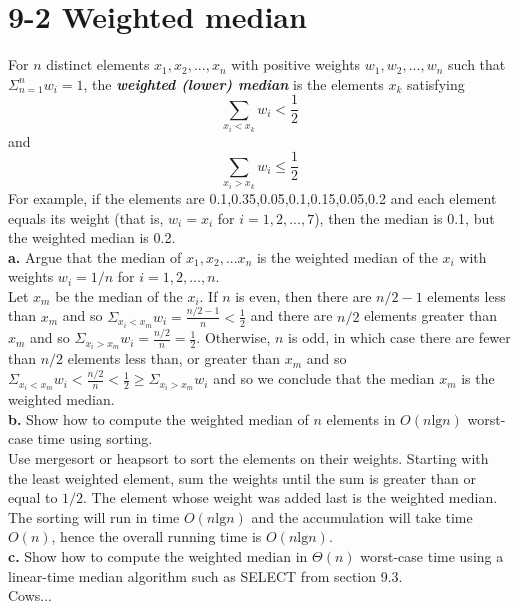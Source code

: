 \documentclass[10pt,a4paper]{article}
\begin{document}
\section*{9-2 Weighted median}
For $n$ distinct elements $x_1,x_2,...,x_n$ with positive weights $w_1,w_2,...,w_n$ such that $\Sigma_{n=1}^{n}w_i=1$, the \textbf{\textit{weighted (lower) median}} is the elements $x_k$ satisfying
\begin{displaymath}
	\displaystyle\sum_{x_i<x_k} w_i<\frac{1}{2}
\end{displaymath}
and
\begin{displaymath}
	\displaystyle\sum_{x_i>x_k} w_i\leq\frac{1}{2}
\end{displaymath}
For example, if the elements are 0.1,0.35,0.05,0.1,0.15,0.05,0.2 and each element equals its weight (that is, $w_i=x_i$ for $i=1,2,...,7$), then the median is 0.1, but the weighted median is 0.2.
\vspace*{\baselineskip}
\\
\textbf{a.} Argue that the median of $x_1,x_2,...x_n$ is the weighted median of the $x_i$ with weights $w_i=1/n$ for $i=1,2,...,n$.
\vspace*{\baselineskip}
\\
Let $x_m$ be the median of the $x_i$. If $n$ is even, then there are $n/2 - 1$ elements less than $x_m$ and so $\Sigma_{x_i<x_m} w_i = \frac{n/2 - 1}{n} < \frac{1}{2}$ and there are $n/2$ elements greater than $x_m$ and so $\Sigma_{x_i > x_m} w_i = \frac{n/2}{n} = \frac{1}{2}$. Otherwise, $n$ is odd, in which case there are fewer than $n/2$ elements less than, or greater than $x_m$ and so $\Sigma_{x_i<x_m} w_i < \frac{n/2}{n} < \frac{1}{2} \geq \Sigma_{x_i>x_m} w_i$ and so we conclude that the median $x_m$ is the weighted median.
\vspace*{\baselineskip}
\\
\textbf{b.} Show how to compute the weighted median of $n$ elements in $O(n\text{lg}n)$ worst-case time using sorting.
\vspace*{\baselineskip}
\\
Use mergesort or heapsort to sort the elements on their weights. Starting with the least weighted element, sum the weights until the sum is greater than or equal to $1/2$. The element whose weight was added last is the weighted median. The sorting will run in time $O(n\text{lg}n)$ and the accumulation will take time $O(n)$, hence the overall running time is $O(n\text{lg}n)$.
\vspace*{\baselineskip}
\\
\textbf{c.} Show how to compute the weighted median in $\Theta (n)$ worst-case time using a linear-time median algorithm such as SELECT from section 9.3.
\vspace*{\baselineskip}
\\
Cows...
\end{document}
